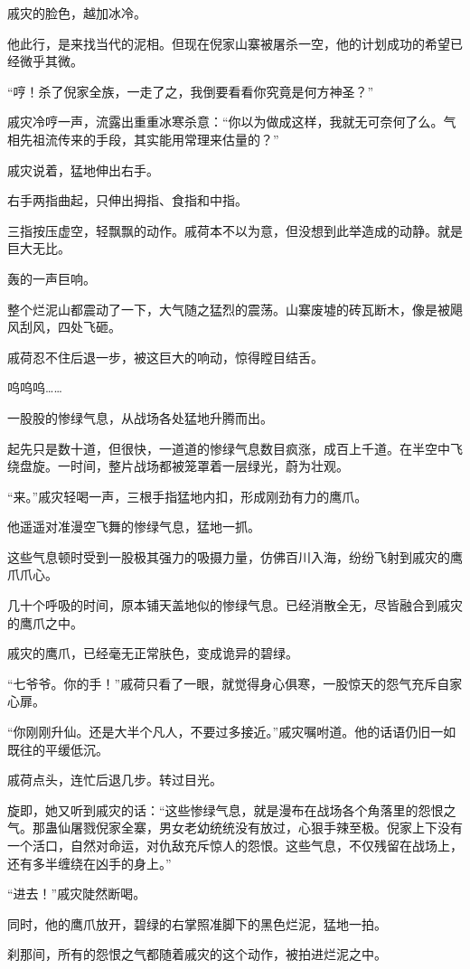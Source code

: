 \begin{this_body}
戚灾的脸色，越加冰冷。

他此行，是来找当代的泥相。但现在倪家山寨被屠杀一空，他的计划成功的希望已经微乎其微。

“哼！杀了倪家全族，一走了之，我倒要看看你究竟是何方神圣？”

戚灾冷哼一声，流露出重重冰寒杀意：“你以为做成这样，我就无可奈何了么。气相先祖流传来的手段，其实能用常理来估量的？”

戚灾说着，猛地伸出右手。

右手两指曲起，只伸出拇指、食指和中指。

三指按压虚空，轻飘飘的动作。戚荷本不以为意，但没想到此举造成的动静。就是巨大无比。

轰的一声巨响。

整个烂泥山都震动了一下，大气随之猛烈的震荡。山寨废墟的砖瓦断木，像是被飓风刮风，四处飞砸。

戚荷忍不住后退一步，被这巨大的响动，惊得瞠目结舌。

呜呜呜……

一股股的惨绿气息，从战场各处猛地升腾而出。

起先只是数十道，但很快，一道道的惨绿气息数目疯涨，成百上千道。在半空中飞绕盘旋。一时间，整片战场都被笼罩着一层绿光，蔚为壮观。

“来。”戚灾轻喝一声，三根手指猛地内扣，形成刚劲有力的鹰爪。

他遥遥对准漫空飞舞的惨绿气息，猛地一抓。

这些气息顿时受到一股极其强力的吸摄力量，仿佛百川入海，纷纷飞射到戚灾的鹰爪爪心。

几十个呼吸的时间，原本铺天盖地似的惨绿气息。已经消散全无，尽皆融合到戚灾的鹰爪之中。

戚灾的鹰爪，已经毫无正常肤色，变成诡异的碧绿。

“七爷爷。你的手！”戚荷只看了一眼，就觉得身心俱寒，一股惊天的怨气充斥自家心扉。

“你刚刚升仙。还是大半个凡人，不要过多接近。”戚灾嘱咐道。他的话语仍旧一如既往的平缓低沉。

戚荷点头，连忙后退几步。转过目光。

旋即，她又听到戚灾的话：“这些惨绿气息，就是漫布在战场各个角落里的怨恨之气。那蛊仙屠戮倪家全寨，男女老幼统统没有放过，心狠手辣至极。倪家上下没有一个活口，自然对命运，对仇敌充斥惊人的怨恨。这些气息，不仅残留在战场上，还有多半缠绕在凶手的身上。”

“进去！”戚灾陡然断喝。

同时，他的鹰爪放开，碧绿的右掌照准脚下的黑色烂泥，猛地一拍。

刹那间，所有的怨恨之气都随着戚灾的这个动作，被拍进烂泥之中。


\end{this_body}
